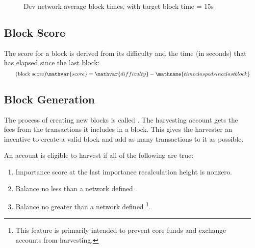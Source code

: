 \begin{figure}
	\caption{Dev network average block times, with target block time = 15s}
\end{figure}

\subsection{Block Score}
\label{sec:blockchain:blockScore}
\label{sec:blockchain:score}

The score for a block is derived from its difficulty and the time (in seconds) that has elapsed since the last block:
\begin{equation}
	\tag{block score} \mathvar{score} = \mathvar{difficulty} - \mathname{time elasped since last block}
\end{equation}

\subsection{Block Generation}
\label{sec:blockchain:generation}

The process of creating new blocks is called .
The harvesting account gets the fees from the transactions it includes in a block.
This gives the harvester an incentive to create a valid block and add as many transactions to it as possible.

An account is eligible to harvest if all of the following are true:
\begin{enumerate}
	\item{Importance score at the last importance recalculation height is nonzero.}
	\item{Balance no less than a network defined .}
	\item{
		Balance no greater than a network defined 
		\footnote{This feature is primarily intended to prevent core funds and exchange accounts from harvesting.}.
	}
\end{enumerate}

